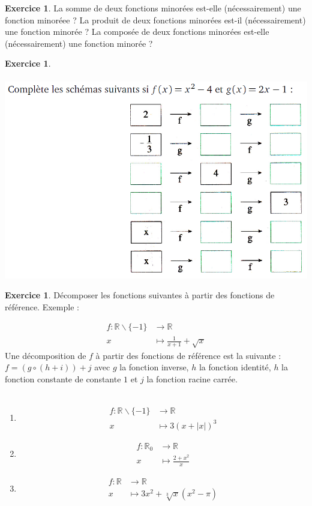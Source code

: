 \documentclass[a4paper,13pt]{scrreprt}
\theoremstyle{plain}
\theoremstyle{definition}
\newtheorem{exo}[subsection]{Exercice}
\newcommand{\rr}{\mathbb{R}}
\begin{document}
\begin{exo} \label{exof24}
	La somme de deux fonctions minorées est-elle (nécessairement) une fonction minoréee ? La produit de deux fonctions minorées est-il (nécessairement) une fonction minorée ? La composée de deux fonctions minorées est-elle (nécessairement) une fonction minorée ? 
\end{exo}
\newpage
\begin{exo} \label{exof26}
	~~\\ ~~\\	
	\includegraphics[scale=0.6]{qC.PNG}
\end{exo}

\begin{exo} \label{exof27}
 Décomposer les fonctions suivantes à partir des fonctions de référence.
 Exemple :
 	\item \begin{align*}
 	f : \rr \backslash \{-1\} &\to \rr \\
 	x &\mapsto \frac{1}{x+1} + \sqrt{x}
 	\end{align*}
 Une décomposition de $f$ à partir des fonctions de référence est la suivante : $f = (g \circ (h + i)) + j$ avec $g$ la fonction inverse, $h$ la fonction identité, $h$ la fonction constante de constante $1$ et $j$ la fonction racine carrée. \\
 ~~\\
 \begin{enumerate}
 	\item \begin{align*}
 	f : \rr \backslash \{-1\} &\to \rr \\
 	x &\mapsto 3(x+|x|)^3
 	\end{align*}
 	\item \begin{align*}
 	f : {\rr}_{0} &\to \rr \\
 	x &\mapsto \frac{2+x^2}{x}
 	\end{align*}
 	\item \begin{align*}
 	f : \rr &\to \rr \\
 	x &\mapsto 3x^2 + \sqrt[3]{x}(x^2-\pi)
 	\end{align*}
 \end{enumerate}
\end{exo}
\end{document}
